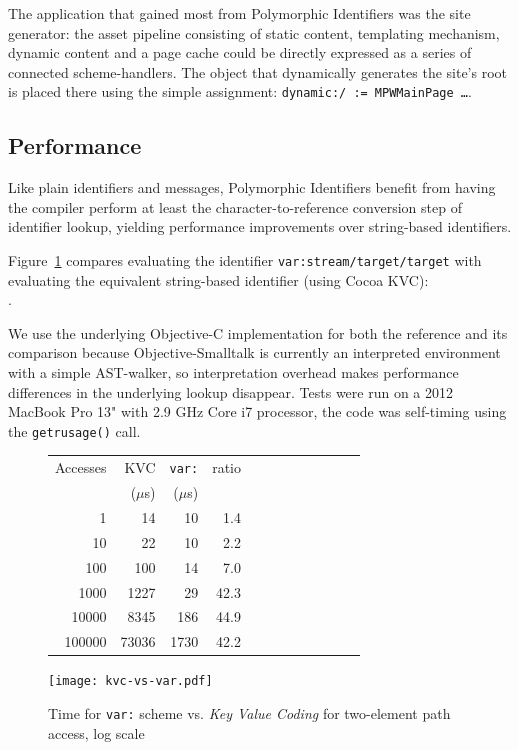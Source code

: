 \documentclass[preprint]{sigplanconf}
\begin{document}
The application that gained most from Polymorphic Identifiers was the site generator:  the asset pipeline consisting of static
content, templating mechanism, dynamic content and a page cache could be directly expressed as a series of connected
scheme-handlers.  The object that dynamically generates the site's root is placed there using the simple assignment: {\tt dynamic:/  := MPWMainPage \dots}.


\subsection{Performance}

Like plain identifiers and messages, Polymorphic Identifiers benefit from having the compiler perform
at least the character-to-reference conversion step of identifier lookup, yielding performance 
improvements over string-based identifiers.

\sloppy
Figure~\ref{var-speed} compares evaluating the identifier {\tt var:stream/target/target} with evaluating the  
equivalent string-based identifier (using Cocoa KVC): \\  { . }
\fussy

We use the underlying Objective-C implementation for both the reference and its 
comparison because Objective-Smalltalk is currently an interpreted environment with
a simple AST-walker, so interpretation overhead makes performance differences in
the underlying lookup disappear.  Tests were run on a 2012 MacBook Pro 13" with 2.9 GHz Core i7 processor, the
code was self-timing using the {\tt getrusage()} call.  

\begin{figure}
\begin{minipage}[c]{0.38\textwidth}
\begin{tabular}{|r|r|r|r|r|r|r|r|r|r|r|r|} \hline
Accesses  & KVC& {\tt var:}   & ratio	\\ 
 & ($\mu$s) & ($\mu$s) & \\ \hline
1 & 14 & 10 & 1.4   \\ %
10 & 22 & 10 &   2.2 \\   %
100 & 100 & 14 &  7.0\\   %
1000 & 1227 & 29 &  42.3  \\  %
10000 & 8345 & 186 &   44.9 \\   %
100000 & 73036 & 1730 &    42.2 \\ \hline
\end{tabular}
\end{minipage}
\begin{minipage}[c]{0.39\textwidth}
\texttt{[image: kvc-vs-var.pdf]}
\end{minipage}
\vspace{-2.0em}
\caption{Time for  {\tt var:} scheme vs. \emph{Key Value Coding} for two-element path access, log scale}
\label{var-speed}
\end{figure}
\end{document}
